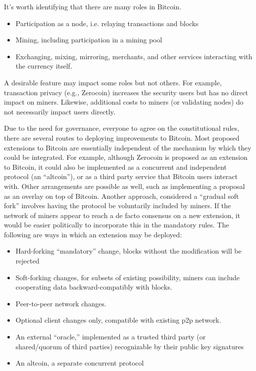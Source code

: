 It's worth identifying that there are many roles in Bitcoin.
\begin{itemize}
\item Participation as a node, i.e. relaying transactions and blocks
\item Mining, including participation in a mining pool
\item Exchanging, mixing, mirroring, merchants, and other services interacting with the currency itself.
\end{itemize}
A desirable feature may impact some roles but not others. For example, transaction privacy (e.g., Zerocoin) increases the security users but has no direct impact on miners. Likewise, additional costs to miners (or validating nodes) do not necessarily impact users directly.

Due to the need for governance, everyone to agree on the constitutional rules, there are several routes to deploying improvements to Bitcoin. Most proposed extensions to Bitcoin are essentially independent of the mechanism by which they could be integrated. For example, although Zerocoin is proposed as an extension to Bitcoin, it could also be implemented as a concurrent and independent protocol (an ``altcoin''), or as a third party service that Bitcoin users interact with. Other arrangements are possible as well, such as implementing a proposal as an overlay on top of Bitcoin. Another approach, considered a ``gradual soft fork'' involves having the protocol be voluntarily included by miners. If the network of miners appear to reach a de facto consensus on a new extension, it would be easier politically to incorporate this in the mandatory rules. The following are ways in which an extension may be deployed:

\begin{itemize}
\item Hard-forking ``mandatory'' change, blocks without the modification will be rejected
\item Soft-forking changes, for subsets of existing possibility, miners can include cooperating data backward-compatibly with blocks.
\item Peer-to-peer network changes.
\item Optional client changes only, compatible with existing p2p network.
\item An external ``oracle,'' implemented as a trusted third party (or shared/quorum of third parties) recognizable by their public key signatures
\item An altcoin, a separate concurrent protocol
\end{itemize}


